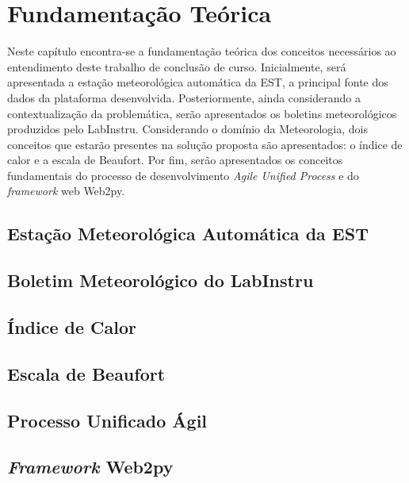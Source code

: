 \chapter{Fundamentação Teórica} \label{cap:fundamentacao}

Neste capítulo encontra-se a fundamentação teórica dos conceitos necessários ao entendimento deste trabalho de conclusão de curso. Inicialmente, será apresentada a estação meteorológica automática da EST, a principal fonte dos dados da plataforma desenvolvida. Posteriormente, ainda considerando a contextualização da problemática, serão apresentados os boletins meteorológicos produzidos pelo LabInstru. Considerando o domínio da Meteorologia, dois conceitos que estarão presentes na solução proposta são apresentados: o índice de calor e a escala de Beaufort. Por fim, serão apresentados os conceitos fundamentais do processo de desenvolvimento \emph{Agile Unified Process} e do \emph{framework} web Web2py.

\section{Estação Meteorológica Automática da EST}


\section{Boletim Meteorológico do LabInstru} \label{sec:boletim}


\section{Índice de Calor}


\section{Escala de Beaufort}


\section{Processo Unificado Ágil}


\section{\emph{Framework} Web2py} \label{sec:web2py}

